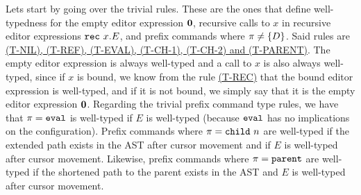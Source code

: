 Lets start by going over the trivial rules. These are the ones that define
well-typedness for the empty editor expression $\mathbf{0}$, recursive calls to $x$ in
recursive editor expressions $\texttt{rec}~x.E$, and prefix commands where $\pi \neq
\{ D \}$. Said rules are \hyperref[fig:asttyperules]{(T-NIL), (T-REF), (T-EVAL),
(T-CH-1), (T-CH-2) and (T-PARENT)}. The empty editor expression is always
well-typed and a call to $x$ is also always well-typed, since if $x$ is bound,
we know from the rule \hyperref[fig:asttyperules]{(T-REC)} that the bound editor
expression is well-typed, and if it is not bound, we simply say that it is the
empty editor expression $\mathbf{0}$. Regarding the trivial prefix command type rules,
we have that $\pi = \texttt{eval}$ is well-typed if $E$ is well-typed (because $\texttt{eval}$
has no implications on the configuration). Prefix commands where $\pi = \texttt{child}~n$ are well-typed if the extended path exists in the AST after cursor movement
and if $E$ is well-typed after cursor movement. Likewise, prefix commands where
$\pi = \texttt{parent}$ are well-typed if the shortened path to the parent exists in the
AST and $E$ is well-typed after cursor movement.

